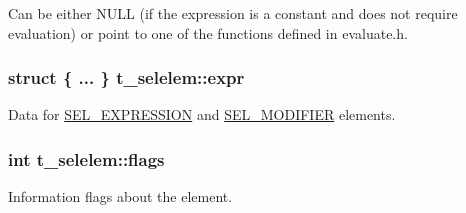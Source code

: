 \-Can be either \-N\-U\-L\-L (if the expression is a constant and does not require evaluation) or point to one of the functions defined in evaluate.\-h. \hypertarget{structt__selelem_aae043fe67c7daa99ee1b4cb7b58cd1f0}{
\subsubsection[{expr}]{\setlength{\rightskip}{0pt plus 5cm}struct \{ ... \}                                 {\bf t\-\_\-selelem\-::expr}}}\label{structt__selelem_aae043fe67c7daa99ee1b4cb7b58cd1f0}
\-Data for \hyperlink{selelem_8h_a1f104d5c71b1198ef51acc4ef016ae46a3d3bb644ace8fdc5beac6feed4911a1f}{\-S\-E\-L\-\_\-\-E\-X\-P\-R\-E\-S\-S\-I\-O\-N} and \hyperlink{selelem_8h_a1f104d5c71b1198ef51acc4ef016ae46a6be1ee895a50c28639608b8b47843422}{\-S\-E\-L\-\_\-\-M\-O\-D\-I\-F\-I\-E\-R} elements. \hypertarget{structt__selelem_adda179aca4efb2083ea41e01f10f6b50}{
\subsubsection[{flags}]{\setlength{\rightskip}{0pt plus 5cm}int {\bf t\-\_\-selelem\-::flags}}}\label{structt__selelem_adda179aca4efb2083ea41e01f10f6b50}


\-Information flags about the element. 

